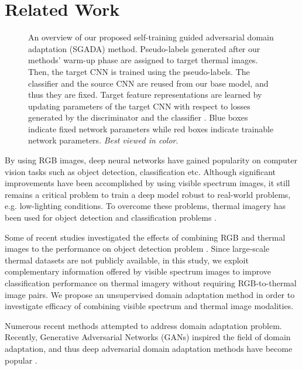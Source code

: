 \documentclass[final]{cvpr}
\begin{document}
\section{Related Work}

\begin{figure*}[ht]
\centering
    \vspace{3mm}
    \caption{An overview of our proposed self-training guided adversarial domain adaptation (SGADA) method. Pseudo-labels generated after our methods' warm-up phase are assigned to target thermal images. Then, the target CNN  is trained using the pseudo-labels. The classifier  and the source CNN  are reused from our base model, and thus they are fixed. Target feature representations are learned by updating parameters of the target CNN  with respect to losses generated by the discriminator  and the classifier . Blue boxes indicate fixed network parameters while red boxes indicate trainable network parameters. \textit{Best viewed in color}.}
    \label{fig:overview}
\end{figure*}

By using RGB images, deep neural networks have gained popularity on computer vision tasks such as object detection, classification etc. Although significant improvements have been accomplished by using visible spectrum images, it still remains a critical problem to train a deep model robust to real-world problems, e.g. low-lighting conditions. To overcome these problems, thermal imagery has been used for object detection and classification problems \cite{guo2019domain, kaist, saponaro2015material}.

Some of recent studies investigated the effects of combining RGB and thermal images to the performance on object detection problem \cite{devaguptapu2019borrow, guo2019domain, kaist, BMVC2016_73}. Since large-scale thermal datasets are not publicly available, in this study, we exploit complementary information offered by visible spectrum images to improve classification performance on thermal imagery without requiring RGB-to-thermal image pairs. We propose an unsupervised domain adaptation method in order to investigate efficacy of combining visible spectrum and thermal image modalities. 

Numerous recent methods attempted to address domain adaptation problem. Recently, Generative Adversarial Networks (GANs) \cite{gan} inspired the field of domain adaptation, and thus deep adversarial domain adaptation methods have become popular \cite{pixelda, dann, tat, cdan, adda}.
\end{document}
